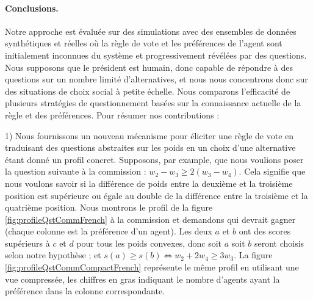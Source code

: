 	\paragraph{Conclusions.}
	Notre approche est évaluée sur des simulations avec des ensembles de données synthétiques et réelles où la règle de vote et les préférences de l'agent sont initialement inconnues du système et progressivement révélées par des questions. Nous supposons que le président est humain, donc capable de répondre à des questions sur un nombre limité d'alternatives, et nous nous concentrons donc sur des situations de choix social à petite échelle. Nous comparons l'efficacité de plusieurs stratégies de questionnement basées sur la connaissance actuelle de la règle et des préférences. Pour résumer nos contributions : 
	
	1) Nous fournissons un nouveau mécanisme pour éliciter une règle de vote en traduisant des questions abstraites sur les poids en un choix d'une alternative étant donné un profil concret. 
	Supposons, par example, que nous voulions poser la question suivante à la commission : $w_{2} - w_{3} ≥ 2 (w_{3} - w_{4})$. Cela signifie que nous voulons savoir si la différence de poids entre la deuxième et la troisième position est supérieure ou égale au double de la différence entre la troisième et la quatrième position. Nous montrons le profil de la figure \ref{fig:profileQstCommFrench} à la commission et demandons qui devrait gagner (chaque colonne est la préférence d'un agent).
	Les deux $a$ et $b$ ont des scores supérieurs à $c$ et $d$ pour tous les poids convexes, donc soit $a$ soit $b$ seront choisis selon notre hypothèse ; et $s(a) ≥ s(b) ⇔ w_2 + 2 w_4 ≥ 3 w_3$.
	La figure \ref{fig:profileQstCommCompactFrench} représente le même profil en utilisant une vue compressée, les chiffres en gras indiquant le nombre d'agents ayant la préférence dans la colonne correspondante.
	
